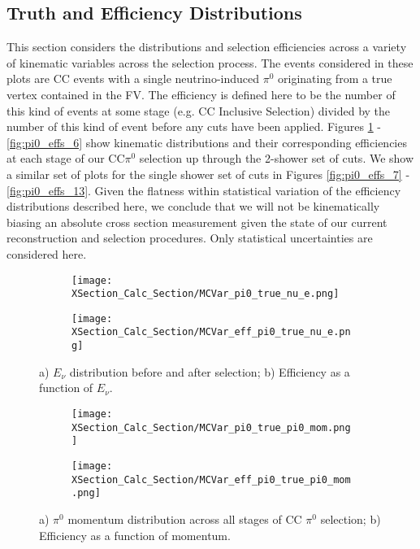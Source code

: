 \subsection{Truth and Efficiency Distributions}
This section considers the distributions and selection efficiencies across a variety of kinematic variables across the selection process.  The events considered in these plots are CC events with a single neutrino-induced $\pi^0$ originating from a true vertex contained in the FV. The efficiency is defined here to be the number of this kind of events at some stage (e.g. CC Inclusive Selection) divided by the number of this kind of event before any cuts have been applied.  Figures \ref{fig:pi0_effs_0} - \ref{fig:pi0_effs_6} show kinematic distributions and their corresponding efficiencies at each stage of our CC$\pi^0$ selection up through the 2-shower set of cuts.  We show a similar set of plots for the single shower set of cuts in Figures \ref{fig:pi0_effs_7} - \ref{fig:pi0_effs_13}. Given the flatness within statistical variation of the efficiency distributions described here, we conclude that we will not be kinematically biasing an absolute cross section measurement given the state of our current reconstruction and selection procedures. Only statistical uncertainties are considered here. 

\begin{figure}[h!]
\centering

 \begin{subfigure}[t]{0.39\textwidth}
    \centering
    \texttt{[image: XSection\_Calc\_Section/MCVar\_pi0\_true\_nu\_e.png]}
  \caption{ }
  \end{subfigure} 
  \hspace{20mm}
  \begin{subfigure}[t]{0.39\textwidth}
    \centering
\texttt{[image: XSection\_Calc\_Section/MCVar\_eff\_pi0\_true\_nu\_e.png]}
  \caption{ }
  \end{subfigure} 
\caption{a) $E_\nu$ distribution before and after selection; b) Efficiency as a function of $E_\nu$. }
\label{fig:pi0_effs_0}
\end{figure}

\begin{figure}[t!]
\centering
  \begin{subfigure}[t]{0.39\textwidth}
    \centering
\texttt{[image: XSection\_Calc\_Section/MCVar\_pi0\_true\_pi0\_mom.png]}
  \caption{ }
  \end{subfigure} 
  \hspace{20mm}
  \begin{subfigure}[t]{0.39\textwidth}
    \centering
\texttt{[image: XSection\_Calc\_Section/MCVar\_eff\_pi0\_true\_pi0\_mom.png]}
  \caption{ }
  \end{subfigure} 
\caption{a) $\pi^0$ momentum distribution across all stages of CC $\pi^0$ selection; b) Efficiency as a function of momentum. }
\label{fig:pi0_effs_1}
\end{figure}

